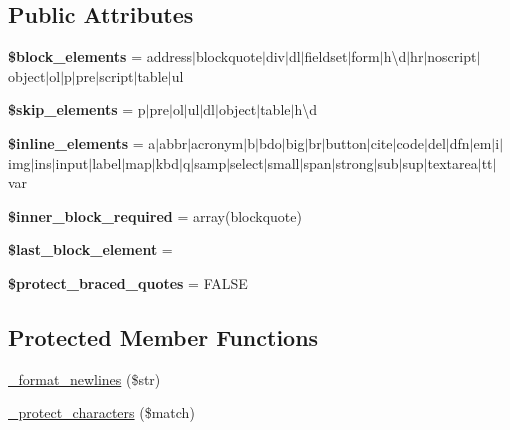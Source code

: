 \subsection*{Public Attributes}
\begin{DoxyCompactItemize}
\item 
\mbox{\label{class_c_i___typography_a78b9f1b8fd85603aab2f14638e381d94}} 
{\bfseries \$block\+\_\+elements} = \textquotesingle{}address$\vert$blockquote$\vert$div$\vert$dl$\vert$fieldset$\vert$form$\vert$h\textbackslash{}d$\vert$hr$\vert$noscript$\vert$object$\vert$ol$\vert$p$\vert$pre$\vert$script$\vert$table$\vert$ul\textquotesingle{}
\item 
\mbox{\label{class_c_i___typography_aa0ee593d246615f0c0bab1c0fa2e03e8}} 
{\bfseries \$skip\+\_\+elements} = \textquotesingle{}p$\vert$pre$\vert$ol$\vert$ul$\vert$dl$\vert$object$\vert$table$\vert$h\textbackslash{}d\textquotesingle{}
\item 
\mbox{\label{class_c_i___typography_a2772dc4c22f30d52e96cc09a440e5080}} 
{\bfseries \$inline\+\_\+elements} = \textquotesingle{}a$\vert$abbr$\vert$acronym$\vert$b$\vert$bdo$\vert$big$\vert$br$\vert$button$\vert$cite$\vert$code$\vert$del$\vert$dfn$\vert$em$\vert$i$\vert$img$\vert$ins$\vert$input$\vert$label$\vert$map$\vert$kbd$\vert$q$\vert$samp$\vert$select$\vert$small$\vert$span$\vert$strong$\vert$sub$\vert$sup$\vert$textarea$\vert$tt$\vert$var\textquotesingle{}
\item 
\mbox{\label{class_c_i___typography_ae246801dd320c8171c283e144682ba80}} 
{\bfseries \$inner\+\_\+block\+\_\+required} = array(\textquotesingle{}blockquote\textquotesingle{})
\item 
\mbox{\label{class_c_i___typography_a846c63faf41361c9ecbfe781e9a198e6}} 
{\bfseries \$last\+\_\+block\+\_\+element} = \textquotesingle{}\textquotesingle{}
\item 
\mbox{\label{class_c_i___typography_a77b88545cea8a0fdd264b0c6f5b142e2}} 
{\bfseries \$protect\+\_\+braced\+\_\+quotes} = F\+A\+L\+SE
\end{DoxyCompactItemize}
\subsection*{Protected Member Functions}
\begin{DoxyCompactItemize}
\item 
\mbox{\hyperlink{class_c_i___typography_aa3b84cf3b14fe86bad4365e482108814}{\+\_\+format\+\_\+newlines}} (\$str)
\item 
\mbox{\hyperlink{class_c_i___typography_a8ba7063a75c8d4c04e6067c98e32d44b}{\+\_\+protect\+\_\+characters}} (\$match)
\end{DoxyCompactItemize}


